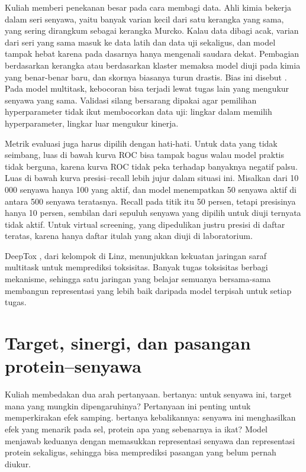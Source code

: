 Kuliah memberi penekanan besar pada cara membagi data. Ahli kimia bekerja dalam seri senyawa, yaitu banyak varian kecil
dari satu kerangka yang sama, yang sering dirangkum sebagai kerangka Murcko. Kalau data dibagi acak, varian dari seri
yang sama masuk ke data latih dan data uji sekaligus, dan model tampak hebat karena pada dasarnya hanya mengenali saudara
dekat. Pembagian berdasarkan kerangka atau berdasarkan klaster memaksa model diuji pada kimia yang benar-benar baru, dan
skornya biasanya turun drastis. Bias ini disebut . Pada model multitask, kebocoran bisa terjadi
lewat tugas lain yang mengukur senyawa yang sama. Validasi silang bersarang dipakai agar pemilihan hyperparameter tidak
ikut membocorkan data uji: lingkar dalam memilih hyperparameter, lingkar luar mengukur kinerja.

Metrik evaluasi juga harus dipilih dengan hati-hati. Untuk data yang tidak seimbang, luas di bawah kurva ROC bisa
tampak bagus walau model praktis tidak berguna, karena kurva ROC tidak peka terhadap banyaknya negatif palsu. Luas di
bawah kurva presisi--recall lebih jujur dalam situasi ini. Misalkan dari 10\,000 senyawa hanya 100 yang aktif, dan model
menempatkan 50 senyawa aktif di antara 500 senyawa teratasnya. Recall pada titik itu 50 persen, tetapi presisinya hanya
10 persen, sembilan dari sepuluh senyawa yang dipilih untuk diuji ternyata tidak aktif. Untuk virtual screening, yang
dipedulikan justru presisi di daftar teratas, karena hanya daftar itulah yang akan diuji di laboratorium.

DeepTox \citep{mayr2016}, dari kelompok di Linz, menunjukkan kekuatan jaringan saraf multitask untuk memprediksi
toksisitas. Banyak tugas toksisitas berbagi mekanisme, sehingga satu jaringan yang belajar semuanya bersama-sama
membangun representasi yang lebih baik daripada model terpisah untuk setiap tugas.

\section{Target, sinergi, dan pasangan protein--senyawa}

Kuliah membedakan dua arah pertanyaan.  bertanya: untuk senyawa ini, target mana yang mungkin
dipengaruhinya? Pertanyaan ini penting untuk memperkirakan efek samping.  bertanya kebalikannya:
senyawa ini menghasilkan efek yang menarik pada sel, protein apa yang sebenarnya ia ikat? Model
 menjawab keduanya dengan memasukkan representasi senyawa dan representasi protein sekaligus,
sehingga bisa memprediksi pasangan yang belum pernah diukur.

